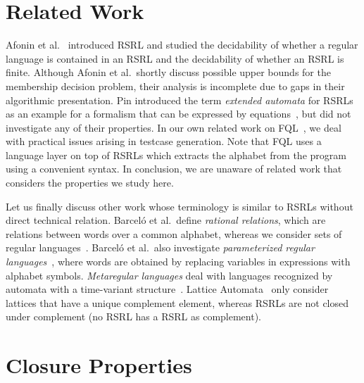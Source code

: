 \documentclass[envcountsame]{llncs}
\newcommand{\RegularlyGeneratedLanguageSetAbbrev}{RSRL\xspace}
\newcommand{\RegularlyGeneratedLanguageSetsAbbrev}{RSRLs\xspace}
\newcommand{\RegularlyGeneratedLanguageSetsStartAbbrev}{RSRL\xspace}
\newcommand{\FQL}{FQL\xspace}
\begin{document}
 \section{Related Work}

Afonin et al.~\cite{membership} introduced
\RegularlyGeneratedLanguageSetsStartAbbrev and studied the
decidability of whether a regular language is contained in an
\RegularlyGeneratedLanguageSetsStartAbbrev and the decidability of
whether an \RegularlyGeneratedLanguageSetsStartAbbrev is finite.
Although Afonin et al.~shortly discuss possible upper bounds for the
membership decision problem, their analysis is incomplete due to gaps
in their algorithmic presentation. 
Pin introduced the term \emph{extended automata} for
\RegularlyGeneratedLanguageSetsAbbrev as an example for a formalism that can be expressed by equations~\cite{Pin}, but
did not investigate any of their properties.
In our own related work on \FQL~\cite{FQL-ASE,holzer12:_provin_reach_using_fshel_compet_contr,holzer11:_seaml_testin_for_model_and_code,holzer10:_introd_to_test_specif_in_fql,holzer09:_query_dirven_progr_testin,holzer08,DBLP:conf/esop/BeyerHTV13}, we deal with practical
issues arising in testcase generation. Note that \FQL uses a language layer on top of 
\RegularlyGeneratedLanguageSetsAbbrev which extracts the alphabet from the program using
a convenient syntax. 
In conclusion, we are unaware of related work that considers the properties we study here.


Let us finally discuss other work whose terminology is similar to \RegularlyGeneratedLanguageSetsAbbrev without
direct technical relation. Barcel{\'o} et al.~define \emph{rational relations}, which are
relations between words over a common alphabet, whereas we consider
sets of regular languages~\cite{DBLP:conf/lics/BarceloFL12}.
Barcel{\'o} et al.~also investigate \emph{parameterized regular
  languages}~\cite{DBLP:journals/tcs/BarceloRL13}, where words are
obtained by replacing variables in expressions with alphabet symbols.
\emph{Metaregular languages} deal with languages recognized by
automata with a time-variant
structure~\cite{1967Agasandyan,Salomaa196885}.
Lattice Automata~\cite{lattice-automata} only consider lattices that
have a unique complement element, whereas
\RegularlyGeneratedLanguageSetsAbbrev are not closed under complement
(no \RegularlyGeneratedLanguageSetAbbrev has a
\RegularlyGeneratedLanguageSetAbbrev as complement).
 \section{Closure Properties}
\label{sec:closure-properties}
\end{document}
